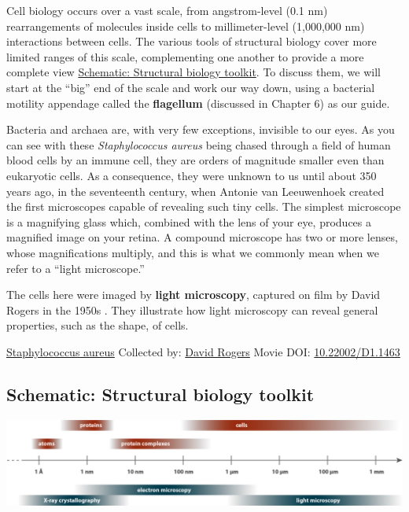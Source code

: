 \documentclass[]{tufte-book}
\begin{document}
Cell biology occurs over a vast scale, from angstrom-level (0.1 nm) rearrangements of molecules inside cells to millimeter-level (1,000,000 nm) interactions between cells. The various tools of structural biology cover more limited ranges of this scale, complementing one another to provide a more complete view \protect\hyperlink{Structural_biology_toolkit}{Schematic: Structural biology toolkit}. To discuss them, we will start at the ``big'' end of the scale and work our way down, using a bacterial motility appendage called the \textbf{flagellum} (discussed in Chapter 6) as our guide.

Bacteria and archaea are, with very few exceptions, invisible to our eyes. As you can see with these \emph{Staphylococcus aureus} being chased through a field of human blood cells by an immune cell, they are orders of magnitude smaller even than eukaryotic cells. As a consequence, they were unknown to us until about 350 years ago, in the seventeenth century, when Antonie van Leeuwenhoek created the first microscopes capable of revealing such tiny cells. The simplest microscope is a magnifying glass which, combined with the lens of your eye, produces a magnified image on your retina. A compound microscope has two or more lenses, whose magnifications multiply, and this is what we commonly mean when we refer to a ``light microscope.''

The cells here were imaged by \textbf{light microscopy}, captured on film by David Rogers in the 1950s \citep{hillInternet}. They illustrate how light microscopy can reveal general properties, such as the shape, of cells.



\hypertarget{htmlwidget-a83096bf204b45fcf873}{}

\label{fig:1-1}\protect\hyperlink{tree}{Staphylococcus aureus} Collected by: \protect\hyperlink{david_rogers}{David Rogers} Movie DOI: \href{https://doi.org/10.22002/D1.1463}{10.22002/D1.1463}

\hypertarget{Structural_biology_toolkit}{%
\subsection*{Schematic: Structural biology toolkit}\label{Structural_biology_toolkit}}

\includegraphics[width=38.54in]{img/schematics/1_1_1}
\end{document}
